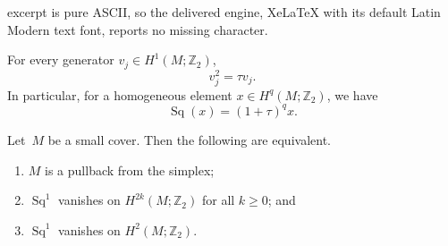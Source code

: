 \documentclass[10pt,a4paper]{amsart}
\DeclareMathOperator{\Sq}{Sq}
\newcommand{\Z}{\mathbb{Z}}
\begin{document}
excerpt is pure ASCII, so the delivered engine, XeLaTeX with its default Latin Modern text font, reports no missing character.
\begin{lemma}\label{lem:square_generator_RT}    
    For every generator $v_j\in H^1(M;\Z_2)$,
    $$
    v_j^2=\tau v_j.
    $$
    In particular, for a homogeneous element $x \in  H^q(M;\Z_2)$, we have
    $$
        \Sq(x)=(1+ \tau)^q x.
    $$
\end{lemma}

\begin{theorem}\label{thm:Sq1_H2_characterizes_simplex_pullback}
    Let~$M$ be a small cover.
    Then the following are equivalent.
    \begin{enumerate}
        \item\label{eq:FT1} $M$ is a pullback from the simplex;
        \item\label{eq:FT2} $\Sq^1$ vanishes on $H^{2k}(M;\Z_2)$ for all $k\geq 0$; and
        \item\label{eq:FT3} $\Sq^1$ vanishes on $H^2(M;\Z_2)$.
    \end{enumerate}
\end{theorem}
\end{document}
